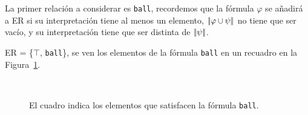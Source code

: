 %
%
%

La primer relaci\'on a considerar es \texttt{ball}, recordemos que la f\'ormula $\varphi$ se a\~nadir\'a a ER si su interpretaci\'on 
tiene al menos un elemento, $|\!|\varphi \cup \psi|\!|$ no tiene que ser vac\'io, y su interpretaci\'on tiene que ser distinta 
de $|\!|\psi|\!|$. 

ER = \{$\top$, \texttt{ball}\}, se ven los elementos de la f\'ormula \texttt{ball} en un recuadro en la Figura~\ref{fig-modelo3}.

%


\begin{figure}[ht]
\begin{center}
\\[0pt]
\caption{El cuadro indica los elementos que satisfacen la f\'ormula \texttt{ball}.}
\label{fig-modelo3}
\end{center}
\end{figure}

